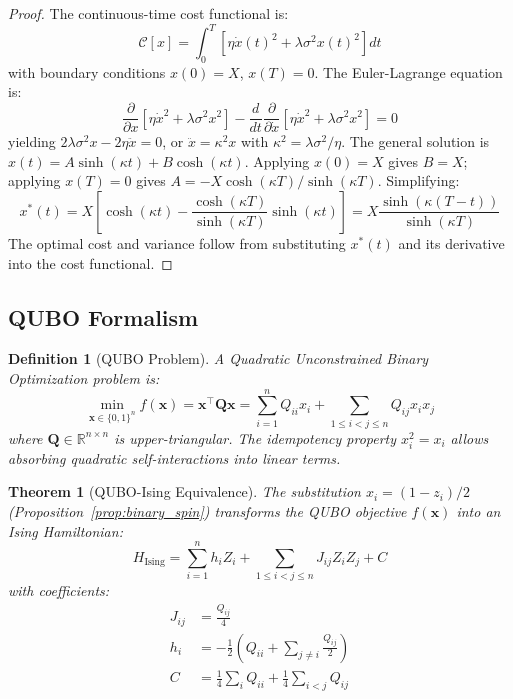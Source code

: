 \documentclass[11pt]{article}
\newcommand{\bx}{\mathbf{x}}
\newcommand{\bQ}{\mathbf{Q}}
\newcommand{\R}{\mathbb{R}}
\newtheorem{theorem}{Theorem}
\newtheorem{definition}{Definition}
\begin{document}
\begin{proof}
The continuous-time cost functional is:
\begin{equation}
\mathcal{C}[x] = \int_0^T \left[\eta \dot{x}(t)^2 + \lambda \sigma^2 x(t)^2\right] dt
\end{equation}
with boundary conditions $x(0) = X$, $x(T) = 0$. The Euler-Lagrange equation is:
\begin{equation}
\frac{\partial}{\partial x}\left[\eta \dot{x}^2 + \lambda\sigma^2 x^2\right] - \frac{d}{dt}\frac{\partial}{\partial \dot{x}}\left[\eta \dot{x}^2 + \lambda\sigma^2 x^2\right] = 0
\end{equation}
yielding $2\lambda\sigma^2 x - 2\eta \ddot{x} = 0$, or $\ddot{x} = \kappa^2 x$ with $\kappa^2 = \lambda\sigma^2/\eta$. The general solution is $x(t) = A\sinh(\kappa t) + B\cosh(\kappa t)$. Applying $x(0)=X$ gives $B=X$; applying $x(T)=0$ gives $A = -X\cosh(\kappa T)/\sinh(\kappa T)$. Simplifying:
\begin{equation}
x^*(t) = X\left[\cosh(\kappa t) - \frac{\cosh(\kappa T)}{\sinh(\kappa T)}\sinh(\kappa t)\right] = X\frac{\sinh(\kappa(T-t))}{\sinh(\kappa T)}
\end{equation}
The optimal cost and variance follow from substituting $x^*(t)$ and its derivative into the cost functional.
\end{proof}

\subsection{QUBO Formalism}
\label{sec:qubo_formalism}

\begin{definition}[QUBO Problem]
A Quadratic Unconstrained Binary Optimization problem is:
\begin{equation}
\min_{\bx \in \{0,1\}^n} f(\bx) = \bx^\top \bQ \bx = \sum_{i=1}^n Q_{ii} x_i + \sum_{1 \le i < j \le n} Q_{ij} x_i x_j
\end{equation}
where $\bQ \in \R^{n \times n}$ is upper-triangular. The idempotency property $x_i^2 = x_i$ allows absorbing quadratic self-interactions into linear terms.
\end{definition}

\begin{theorem}[QUBO-Ising Equivalence]
\label{thm:qubo_ising}
The substitution $x_i = (1 - z_i)/2$ (Proposition~\ref{prop:binary_spin}) transforms the QUBO objective $f(\bx)$ into an Ising Hamiltonian:
\begin{equation}
H_{\mathrm{Ising}} = \sum_{i=1}^n h_i Z_i + \sum_{1 \le i < j \le n} J_{ij} Z_i Z_j + C
\label{eq:ising}
\end{equation}
with coefficients:
\begin{align}
J_{ij} &= \frac{Q_{ij}}{4} \label{eq:J_coeff}\\
h_i &= -\frac{1}{2}\left(Q_{ii} + \sum_{j \neq i} \frac{Q_{ij}}{2}\right) \label{eq:h_coeff}\\
C &= \frac{1}{4}\sum_{i} Q_{ii} + \frac{1}{4}\sum_{i<j} Q_{ij} \label{eq:C_coeff}
\end{align}
\end{theorem}
\end{document}
